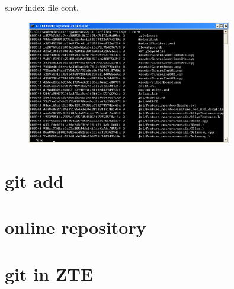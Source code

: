 ﻿\documentclass{beamer}
\begin{document}
\begin{frame}{show index file cont.}
\begin{figure}
  \centering
  \includegraphics[width=0.8\textwidth]{showindex.png}%
\end{figure}
\end{frame}

\section[git add]{git add}
\begin{frame}{}
\end{frame}

\section[online repository]{online repository}
\begin{frame}{}
\end{frame}

\section[git in ZTE]{git in ZTE}
\begin{frame}{}
\end{frame}
\end{document}
